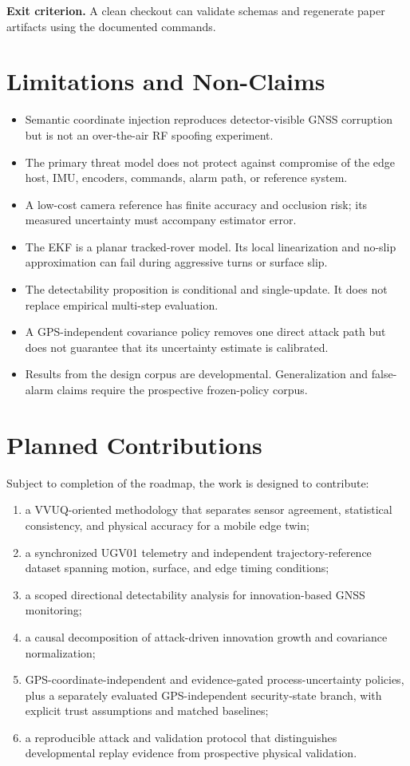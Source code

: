 \documentclass[11pt,a4paper]{article}
\begin{document}
\textbf{Exit criterion.} A clean checkout can validate schemas and regenerate
paper artifacts using the documented commands.

\section{Limitations and Non-Claims}

\begin{itemize}
  \item Semantic coordinate injection reproduces detector-visible GNSS
  corruption but is not an over-the-air RF spoofing experiment.
  \item The primary threat model does not protect against compromise of the
  edge host, IMU, encoders, commands, alarm path, or reference system.
  \item A low-cost camera reference has finite accuracy and occlusion risk; its
  measured uncertainty must accompany estimator error.
  \item The EKF is a planar tracked-rover model. Its local linearization and
  no-slip approximation can fail during aggressive turns or surface slip.
  \item The detectability proposition is conditional and single-update. It
  does not replace empirical multi-step evaluation.
  \item A GPS-independent covariance policy removes one direct attack path but
  does not guarantee that its uncertainty estimate is calibrated.
  \item Results from the design corpus are developmental. Generalization and
  false-alarm claims require the prospective frozen-policy corpus.
\end{itemize}

\section{Planned Contributions}

Subject to completion of the roadmap, the work is designed to contribute:
\begin{enumerate}
  \item a VVUQ-oriented methodology that separates sensor agreement,
  statistical consistency, and physical accuracy for a mobile edge twin;
  \item a synchronized UGV01 telemetry and independent trajectory-reference
  dataset spanning motion, surface, and edge timing conditions;
  \item a scoped directional detectability analysis for innovation-based GNSS
  monitoring;
  \item a causal decomposition of attack-driven innovation growth and
  covariance normalization;
  \item GPS-coordinate-independent and evidence-gated process-uncertainty
  policies, plus a separately evaluated GPS-independent security-state branch,
  with explicit trust assumptions and matched baselines;
  \item a reproducible attack and validation protocol that distinguishes
  developmental replay evidence from prospective physical validation.
\end{enumerate}
\end{document}
